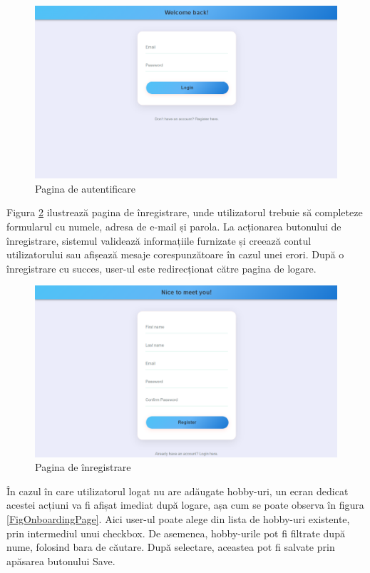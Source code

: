 \begin{figure}[htbp]
	\centering
    \includegraphics[scale=0.27]{./figures/login-page.png}
	\caption{Pagina de autentificare}
	\label{FigLoginPage}
\end{figure}

\par
Figura \ref{FigRegisterPage} ilustrează pagina de înregistrare, unde utilizatorul trebuie să completeze formularul cu numele, adresa de e-mail și parola.
La acționarea butonului de înregistrare, sistemul validează informațiile furnizate și creează contul utilizatorului sau afișează mesaje corespunzătoare în cazul unei erori.
După o înregistrare cu succes, user-ul este redirecționat către pagina de logare.

\begin{figure}[htbp]
	\centering
    \includegraphics[scale=0.32]{./figures/register-page.png}
	\caption{Pagina de înregistrare}
	\label{FigRegisterPage}
\end{figure}

\par
În cazul în care utilizatorul logat nu are adăugate hobby-uri, un ecran dedicat acestei acțiuni va fi afișat imediat după logare, așa cum se poate observa în figura \ref{FigOnboardingPage}.
Aici user-ul poate alege din lista de hobby-uri existente, prin intermediul unui checkbox. 
De asemenea, hobby-urile pot fi filtrate după nume, folosind bara de căutare.
După selectare, aceastea pot fi salvate prin apăsarea butonului Save.

